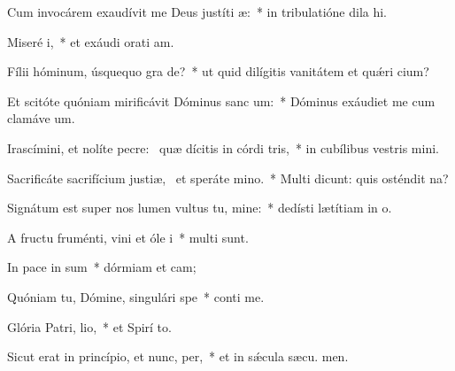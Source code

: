 \item Cum invocárem exaudívit me Deus justíti æ:~* in tribulatióne dila hi.
\item Miseré i,~* et exáudi orati am.
\item Fílii hóminum, úsquequo gra de?~* ut quid dilígitis vanitátem et quǽri cium?
\item Et scitóte quóniam mirificávit Dóminus sanc um:~* Dóminus exáudiet me cum clamáve  um.
\item Irascímini, et nolíte pecre:~\pscross{} quæ dícitis in córdi tris,~* in cubílibus vestris mini.
\item Sacrificáte sacrifícium justiæ,~\pscross{} et speráte  mino.~* Multi dicunt: quis osténdit  na?
\item Signátum est super nos lumen vultus tu, mine:~* dedísti lætítiam in  o.
\item A fructu fruménti, vini et óle i~* multi sunt.
\item In pace in sum~* dórmiam et cam;
\item Quóniam tu, Dómine, singulári  spe~* conti me.
\item Glória Patri,  lio,~* et Spirí to.
\item Sicut erat in princípio, et nunc,  per,~* et in sǽcula sæcu. men.
